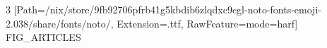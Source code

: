 \documentclass{article}
\date{\today}
\begin{document}
\maketitle

\begin{multicols}{3}
\setmainfont{Noto Color Emoji}[Path=/nix/store/9fb92706pfrb41g5kbdib6zlqdxc9cgl-noto-fonts-emoji-2.038/share/fonts/noto/, Extension=.ttf, RawFeature={mode=harf}]
FIG_ARTICLES
\end{multicols}
\end{document}
